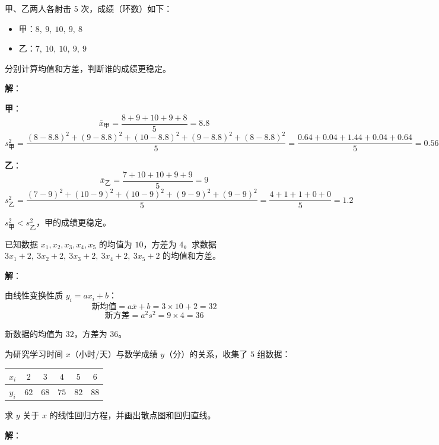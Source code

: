 \documentclass[12pt, a4paper]{ctexart}
\begin{document}
\begin{examplebox}[【例5】均值与方差的计算]
甲、乙两人各射击 $5$ 次，成绩（环数）如下：
\begin{itemize}
  \item 甲：$8,\ 9,\ 10,\ 9,\ 8$
  \item 乙：$7,\ 10,\ 10,\ 9,\ 9$
\end{itemize}
分别计算均值和方差，判断谁的成绩更稳定。
\end{examplebox}

\textbf{解}：

\textbf{甲}：
\[
\bar{x}_{\text{甲}} = \frac{8+9+10+9+8}{5} = 8.8
\]
\[
s^2_{\text{甲}} = \frac{(8{-}8.8)^2+(9{-}8.8)^2+(10{-}8.8)^2+(9{-}8.8)^2+(8{-}8.8)^2}{5} = \frac{0.64+0.04+1.44+0.04+0.64}{5} = 0.56
\]

\textbf{乙}：
\[
\bar{x}_{\text{乙}} = \frac{7+10+10+9+9}{5} = 9
\]
\[
s^2_{\text{乙}} = \frac{(7{-}9)^2+(10{-}9)^2+(10{-}9)^2+(9{-}9)^2+(9{-}9)^2}{5} = \frac{4+1+1+0+0}{5} = 1.2
\]

$s^2_{\text{甲}} < s^2_{\text{乙}}$，甲的成绩更稳定。

\begin{examplebox}[【例6】方差的性质]
已知数据 $x_1, x_2, x_3, x_4, x_5$ 的均值为 $10$，方差为 $4$。求数据 $3x_1+2,\ 3x_2+2,\ 3x_3+2,\ 3x_4+2,\ 3x_5+2$ 的均值和方差。
\end{examplebox}

\textbf{解}：

由线性变换性质 $y_i = ax_i + b$：
\[
\text{新均值} = a\bar{x} + b = 3 \times 10 + 2 = 32
\]
\[
\text{新方差} = a^2 s^2 = 9 \times 4 = 36
\]

新数据的均值为 $32$，方差为 $36$。

\begin{examplebox}[【例7】回归方程]
为研究学习时间 $x$（小时/天）与数学成绩 $y$（分）的关系，收集了 $5$ 组数据：

\begin{center}
\begin{tabular}{cccccc}
\toprule
$x_i$ & $2$ & $3$ & $4$ & $5$ & $6$ \\
\midrule
$y_i$ & $62$ & $68$ & $75$ & $82$ & $88$ \\
\bottomrule
\end{tabular}
\end{center}

求 $y$ 关于 $x$ 的线性回归方程，并画出散点图和回归直线。
\end{examplebox}

\textbf{解}：
\end{document}
